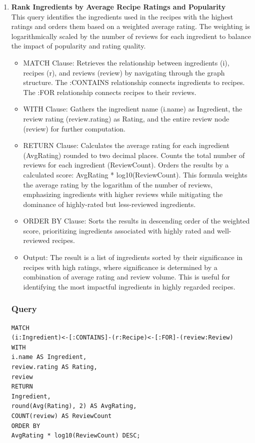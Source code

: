 \begin{enumerate}
    \clearpage
    \item \textbf{Rank Ingredients by Average Recipe Ratings and Popularity}\\
    This query identifies the ingredients used in the recipes with the highest ratings and orders them based on a weighted average rating. The weighting is logarithmically scaled by the number of reviews for each ingredient to balance the impact of popularity and rating quality.
 \begin{itemize}
     \item MATCH Clause:
Retrieves the relationship between ingredients (i), recipes (r), and reviews (review) by navigating through the graph structure.
The :CONTAINS relationship connects ingredients to recipes.
The :FOR relationship connects recipes to their reviews.
    \item WITH Clause:
Gathers the ingredient name (i.name) as Ingredient, the review rating (review.rating) as Rating, and the entire review node (review) for further computation.
    \item RETURN Clause:
Calculates the average rating for each ingredient (AvgRating) rounded to two decimal places.
Counts the total number of reviews for each ingredient (ReviewCount).
Orders the results by a calculated score: AvgRating * log10(ReviewCount). This formula weights the average rating by the logarithm of the number of reviews, emphasizing ingredients with higher reviews while mitigating the dominance of highly-rated but less-reviewed ingredients.
    \item ORDER BY Clause:
Sorts the results in descending order of the weighted score, prioritizing ingredients associated with highly rated and well-reviewed recipes.
    \item Output:
The result is a list of ingredients sorted by their significance in recipes with high ratings, where significance is determined by a combination of average rating and review volume. This is useful for identifying the most impactful ingredients in highly regarded recipes.
 \end{itemize}

    \subsubsection{Query}
    \begin{verbatim}
MATCH 
(i:Ingredient)<-[:CONTAINS]-(r:Recipe)<-[:FOR]-(review:Review)
WITH 
i.name AS Ingredient,
review.rating AS Rating,
review
RETURN 
Ingredient,
round(Avg(Rating), 2) AS AvgRating,
COUNT(review) AS ReviewCount
ORDER BY 
AvgRating * log10(ReviewCount) DESC;
    \end{verbatim}

\end{enumerate}
